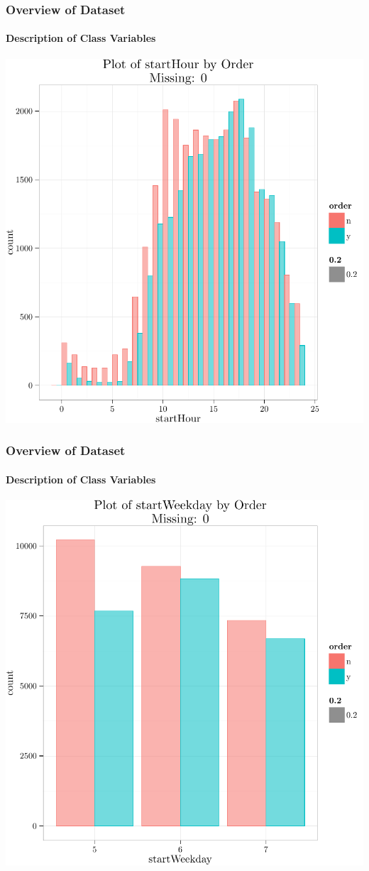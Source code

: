\documentclass[xcolor=dvipsnames,gray,mathserif]{beamer}
\begin{document}
\begin{frame}
   \frametitle{Overview of Dataset}
   \framesubtitle{Description of Class Variables}
   \centerline{\includegraphics[width=.8\linewidth,height=.8\linewidth]{./figs/graphics-SingleDimPlot1}}
\end{frame}
\begin{frame}
   \frametitle{Overview of Dataset}
   \framesubtitle{Description of Class Variables}

   \centerline{\includegraphics[width=.8\linewidth,height=.8\linewidth]{./figs/graphics-SingleDimPlot2}}
\end{frame}
\end{document}
